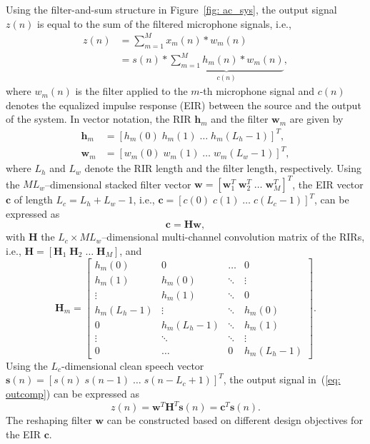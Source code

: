 \documentclass[twocolumn]{bmcart}%
\begin{document}
Using the filter-and-sum structure in Figure~\ref{fig: ac_sys}, the output signal $z(n)$ is equal to the sum of the filtered microphone signals, i.e.,
\begin{align}
  z(n)  & = \sum_{m=1}^{M} x_m(n) \ast  w_m(n) \\
  \label{eq: outcomp}
  & = s(n) \ast \underbrace{\sum_{m=1}^{M} h_m(n) \ast  w_m(n)}_{c(n)},
\end{align}
where $w_m(n)$ is the filter applied to the $m$-th microphone signal and $c(n)$ denotes the equalized impulse response (EIR) between the source and the output of the system.
In vector notation, the RIR $\mathbf{h}_m$ and the filter $\mathbf{w}_m$ are given by 
\begin{align}
\mathbf{h}_m  & = [h_m(0) \; h_m(1) \; \ldots \; h_m(L_h-1)]^T, \\
\mathbf{w}_m  & = [w_m(0) \; w_m(1) \; \ldots \; w_m(L_w-1)]^T,
\end{align}
where $L_h$ and $L_w$ denote the RIR length and the filter length, respectively.
Using the $M L_w$--dimensional stacked filter vector $\mathbf{w} = [\mathbf{w}^T_1 \; \mathbf{w}^T_2 \; \ldots \; \mathbf{w}^T_M]^T$, the EIR vector $\mathbf{c}$ of length $L_c = L_h + L_w - 1$, i.e., $\mathbf{c} = [c(0) \; c(1) \; \ldots \; c(L_c-1)]^T$, can be expressed as~\cite{Miyoshi_ITASS_1988, Kodrasi_ITASLP_2013}
\begin{equation}
\label{eq: eir}
\mathbf{c} = \mathbf{H}\mathbf{w},
\end{equation}
with $\mathbf{H}$ the $L_c \times ML_w$--dimensional multi-channel convolution matrix of the RIRs, i.e., $\mathbf{H}  = [\mathbf{H}_1 \; \mathbf{H}_2 \; \ldots \; \mathbf{H}_M]$, and
\begin{equation}
\mathbf{H}_m \! = \! \begin{bmatrix}
    h_m(0) & 0 &  \ldots & 0 \\
    h_m(1) & h_m(0) & \ddots & \vdots \\
    \vdots & h_m(1) & \ddots & 0 \\
    h_m(L_h\!-\!1) & \vdots & \ddots & h_m(0) \\
    0 & h_m(L_h\!-\!1) & \ddots & h_m(1) \\
    \vdots & \ddots & \ddots & \vdots \\
    0 & \ldots & 0 & h_m(L_h\!-\!1)
   \end{bmatrix}.
 \end{equation}
Using the $L_c$-dimensional clean speech vector $\mathbf{s}(n) = [s(n) \; s(n-1) \; \ldots \; s(n-L_c+1)]^T$, the output signal in~(\ref{eq: outcomp}) can be expressed as
\begin{equation}
\label{eq: out_vec}
z(n) = \mathbf{w}^T\mathbf{H}^T \mathbf{s}(n) = \mathbf{c}^T\mathbf{s}(n).
\end{equation}
The reshaping filter $\mathbf{w}$ can be constructed based on different design objectives for the EIR $\mathbf{c}$.
\end{document}

